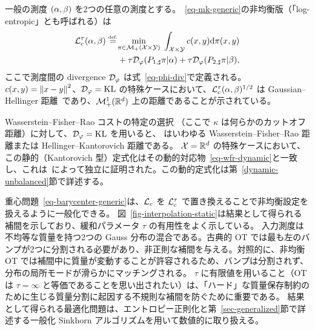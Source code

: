 \begin{rem2}{一般の測度}
$(\alpha,\beta)$ を2つの任意の測度とする。~\eqref{eq-mk-generic}の非均衡版（「log-entropic」とも呼ばれる）は
\begin{align*}
	\mathcal{L}_c^\tau(\alpha,\beta) \stackrel{\mbox{\upshape\tiny def.}}{=}
	&\underset{\pi \in \mathcal{M}_+(\mathcal{X} \times \mathcal{Y})}{\min}\;
		\int_{\mathcal{X} \times \mathcal{Y}} c(x,y) \mathrm{d}\pi(x,y) \\
		&+ \tau \mathcal{D}_\varphi(P_{1,\sharp}\pi|\alpha)
		+ \tau \mathcal{D}_\varphi(P_{2,\sharp}\pi|\beta),
\end{align*}
ここで測度間の divergence $\mathcal{D}_\varphi$ は式~\eqref{eq-phi-div}で定義される。
$c(x,y) = \left\| x-y \right\|^2$、$\mathcal{D}_\varphi=\operatorname{KL}$ の特殊ケースにおいて、$\mathcal{L}_c^\tau(\alpha,\beta)^{1/2}$ は Gaussian--Hellinger 距離~\citep{LieroMielkeSavareLong}であり、$\mathcal{M}_+^1(\mathbb{R}^d)$ 上の距離であることが示されている。
\end{rem2}

\begin{rem2}{Wasserstein--Fisher--Rao}\label{rem-wfr-static}
コストの特定の選択
（ここで $\kappa$ は何らかのカットオフ距離）に対して、$\mathcal{D}_\varphi=\operatorname{KL}$ を用いると、
はいわゆる Wasserstein--Fisher--Rao 距離または Hellinger--Kantorovich 距離である。
$\mathcal{X}=\mathbb{R}^d$ の特殊ケースにおいて、この静的（Kantorovich 型）定式化はその動的対応物~\eqref{eq-wfr-dynamic}と一致し、これは~\citet{LieroMielkeSavareLong,2015-chizat-unbalanced}によって独立に証明された。この動的定式化は第~\ref{dynamic-unbalanced}節で詳述する。
\end{rem2}

重心問題~\eqref{eq-barycenter-generic}は、$\mathcal{L}_{c}$ を $\mathcal{L}_c^\tau$ で置き換えることで非均衡設定を扱えるように一般化できる。
図~\ref{fig-interpolation-static}は結果として得られる補間を示しており、緩和パラメータ $\tau$ の有用性をよく示している。
入力測度は不均等な質量を持つ2つの Gauss 分布の混合である。古典的 OT では最も左のバンプが2つに分割される必要があり、非正則な補間を与える。対照的に、非均衡 OT では補間中に質量が変動することが許容されるため、バンプは分割されず、分布の局所モードが滑らかにマッチングされる。
$\tau$ に有限値を用いること（OT は $\tau=\infty$ と等価であることを思い出されたい）は、「ハード」な質量保存制約のために生じる質量分割に起因する不規則な補間を防ぐために重要である。
結果として得られる最適化問題は、エントロピー正則化と第~\ref{sec-generalized}節で詳述する一般化 Sinkhorn アルゴリズムを用いて数値的に取り扱える。

